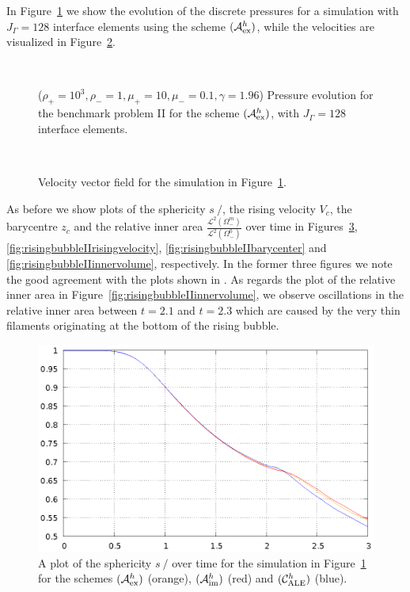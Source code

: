 \documentclass[a4paper,12pt,onecolumn]{article}
\newcommand{\strikes}{\mbox{$s\!\!\!\!\:/$}}
\newcommand{\schemeAex}{{\mathcal{A}^h_{\rm ex}}}
\newcommand{\schemeAim}{{\mathcal{A}^h_{\rm im}}}
\newcommand{\schemeALE}{{\mathcal{C}^h_{\rm ALE}}}
\begin{document}
In Figure~\ref{fig:risingbubbleIIpressure} we show the evolution of the discrete
pressures for a simulation with $J_\Gamma=128$ interface elements using the
scheme $(\schemeAex)$, while the velocities are visualized in
Figure~\ref{fig:risingbubbleIIvelocity}.
\begin{figure}[htbp]
\centering
{}
\\
\caption{($\rho_+ = 10^3,\rho_- = 1,\mu_+ = 10,\mu_- =0.1,\gamma = 1.96$)
Pressure evolution for the benchmark problem II for the scheme $(\schemeAex)$,
with $J_\Gamma=128$ interface elements.}
\label{fig:risingbubbleIIpressure}
\end{figure}%
\begin{figure}[htbp]
\centering
{}
\\
\caption{Velocity vector field for the simulation in
Figure~\ref{fig:risingbubbleIIpressure}.}
\label{fig:risingbubbleIIvelocity}
\end{figure}%
As before we show plots of the sphericity $\strikes$, the
rising velocity $V_c$, the barycentre $z_c$ and the relative
inner area $\frac{\mathcal{L}^2(\Omega^m_-)}{\mathcal{L}^2(\Omega^0_-)}$ over
time in Figures~\ref{fig:risingbubbleIIsphericity},
\ref{fig:risingbubbleIIrisingvelocity}, \ref{fig:risingbubbleIIbarycenter} and
\ref{fig:risingbubbleIIinnervolume}, respectively. In the former three
figures we note the good agreement with the plots shown in
\cite{HysingTKPBGT09}. As regards the plot of the relative inner area
in Figure~\ref{fig:risingbubbleIIinnervolume}, we observe oscillations in
the relative inner area between $t=2.1$ and $t=2.3$ which are caused by
the very thin filaments originating at the bottom of the rising bubble.
\begin{figure}[htbp]
\centering
\includegraphics[width=.45\textwidth]
{figures/rising_bubble_II_sphericity.ps}
\caption{A plot of the sphericity $\strikes$ over time for the simulation in
Figure~\ref{fig:risingbubbleIIpressure} for the schemes $(\schemeAex)$
(orange), $(\schemeAim)$ (red) and $(\schemeALE)$ (blue).}
\label{fig:risingbubbleIIsphericity}
\end{figure}%
\end{document}
